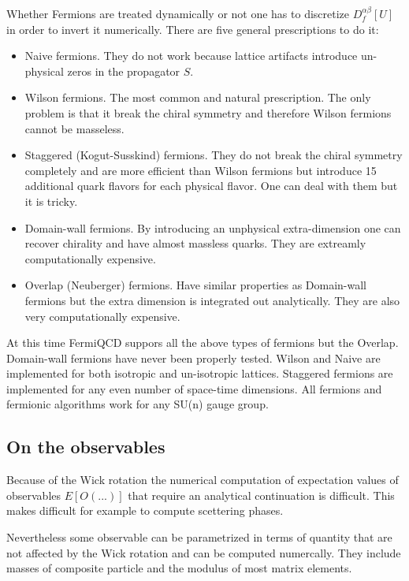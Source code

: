 Whether Fermions are treated dynamically or not one has to discretize $%
D_f^{\alpha \beta }[U]$ in order to invert it numerically. There are five
general prescriptions to do it:

\begin{itemize}
\item  Naive fermions. They do not work because lattice artifacts introduce
un-physical zeros in the propagator $S$.

\item  Wilson fermions. The most common and natural prescription. The only
problem is that it break the chiral symmetry and therefore Wilson fermions
cannot be masseless.

\item  Staggered (Kogut-Susskind) fermions. They do not break the chiral
symmetry completely and are more efficient than Wilson fermions but
introduce 15 additional quark flavors for each physical flavor. One can deal
with them but it is tricky.

\item  Domain-wall fermions. By introducing an unphysical extra-dimension
one can recover chirality and have almost massless quarks. They are
extreamly computationally expensive.

\item  Overlap (Neuberger) fermions. Have similar properties as Domain-wall
fermions but the extra dimension is integrated out analytically. They are
also very computationally expensive.
\end{itemize}

At this time FermiQCD suppors all the above types of fermions but the
Overlap. Domain-wall fermions have never been properly tested. Wilson and
Naive are implemented for both isotropic and un-isotropic lattices.
Staggered fermions are implemented for any even number of space-time
dimensions. All fermions and fermionic algorithms work for any SU(n) gauge
group.

\subsection{On the observables}

Because of the Wick rotation the numerical computation of expectation values
of observables $E[O(...)]$ that require an analytical continuation is
difficult. This makes difficult for example to compute scettering phases.

Nevertheless some observable can be parametrized in terms of quantity that
are not affected by the Wick rotation and can be computed numercally. They
include masses of composite particle and the modulus of most matrix elements.

